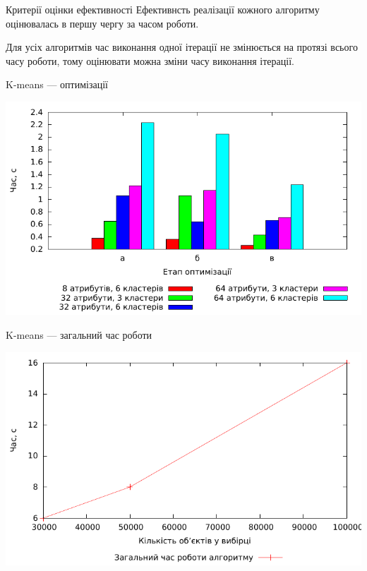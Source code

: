 \documentclass{beamer}
\begin{document}
    \begin{frame}{Критерії оцінки ефективності}
        Ефективнсть реалізації кожного алгоритму оцінювалась в першу чергу за часом роботи.
        
        Для усіх алгоритмів час виконання одної ітерації не змінюється на протязі всього часу роботи, тому оцінювати можна зміни часу виконання ітерації.
    \end{frame}
    
    \begin{frame}{K-means --- оптимізації}
        \begin{center}
            \includegraphics[scale=0.8]{kmeans_iteration_average.pdf}
            
        \end{center}
    \end{frame}
    
    \begin{frame}{K-means --- загальний час роботи}
        \begin{center}
            \includegraphics[scale=0.8]{kmeans_complexity.pdf}
            
        \end{center}
    \end{frame}
    
\end{document}

